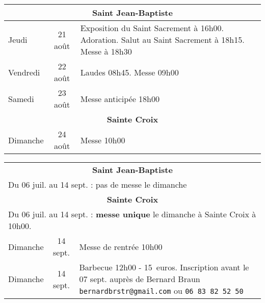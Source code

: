 \documentclass[french,11pt]{article}
\begin{document}
\begin{tabular} {lcp{9cm}}
\multicolumn{3}{c}{\textbf{Saint Jean-Baptiste} } \\ \hline
Jeudi    & 21 août &
Exposition du Saint Sacrement à 16h00. Adoration. Salut au Saint Sacrement à 18h15. Messe à 18h30 
 \\ \hline
Vendredi & 22 août & Laudes 08h45. Messe 09h00 \\ \hline
Samedi   & 23 août & Messe anticipée 18h00 \\ \hline
\multicolumn{3}{c}{\textbf{Sainte Croix} } \\ \hline
Dimanche  & 24 août & Messe 10h00\\ \hline
\end{tabular}

\begin{framed}
\begin{tabular} {lcp{7cm}}
\multicolumn{3}{c}{\textbf{Saint Jean-Baptiste} } \\
\multicolumn{3}{l}{ Du 06 juil. au 14 sept. : pas de messe le dimanche } \\
\multicolumn{3}{c}{\textbf{Sainte Croix} } \\
\multicolumn{3}{l}{ Du 06 juil. au 14 sept. : \textbf{messe unique} le dimanche à Sainte Croix à 10h00.} \\
Dimanche & 14 sept. & Messe de rentrée 10h00 \\
Dimanche & 14 sept. &  Barbecue 12h00 - 15~euros. \newline
 Inscription avant le 07 sept. auprès de Bernard Braun \texttt{bernardbrstr@gmail.com} ou \texttt{06~83~82~52~50}\\
\end{tabular}
\end{framed}
\end{document}

